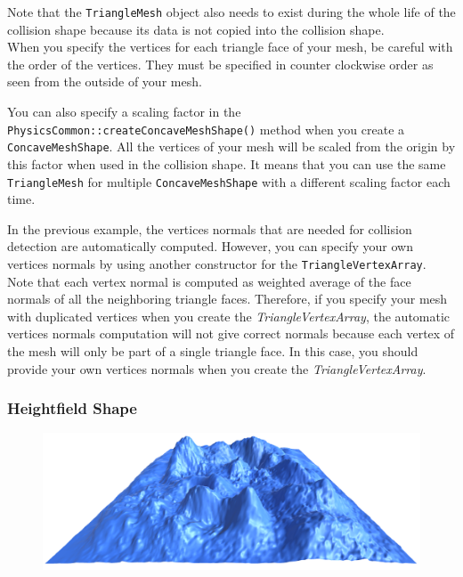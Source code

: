 \documentclass[a4paper,12pt]{article}
\begin{document}
  \vspace{0.6cm}

  Note that the \texttt{TriangleMesh} object also needs to exist during the whole life of the collision shape because its
  data is not copied into the collision shape. \\

  When you specify the vertices for each triangle face of your mesh, be careful with the order of the vertices. They must be specified in counter
  clockwise order as seen from the outside of your mesh. \\

  \begin{sloppypar}
  You can also specify a scaling factor in the \texttt{PhysicsCommon::createConcaveMeshShape()} method when you create a
  \texttt{Concave\allowbreak MeshShape}.
  All the vertices of your mesh will be scaled from the origin by this factor when used in the collision shape. It means that you can use the same
  \texttt{TriangleMesh} for multiple \texttt{ConcaveMeshShape} with a different scaling factor each time. \\
  \end{sloppypar}

  In the previous example, the vertices normals that are needed for collision detection are automatically computed. However, you can specify your own
  vertices normals by using another constructor for the \texttt{TriangleVertexArray}. Note that each vertex normal is computed as weighted average
  of the face normals of all the neighboring triangle faces. Therefore, if you specify your mesh with duplicated vertices when you create the
  \emph{TriangleVertexArray}, the automatic vertices normals computation will not give correct normals because each vertex of the mesh will only be
  part of a single triangle face. In this case, you should provide your own vertices normals when you create the \emph{TriangleVertexArray}. \\

  \subsubsection{Heightfield Shape}

  \begin{figure}[h]
      \centering
      \includegraphics{heightfieldshape.png}
      \label{fig:heightfieldshape}
  \end{figure}
\end{document}
